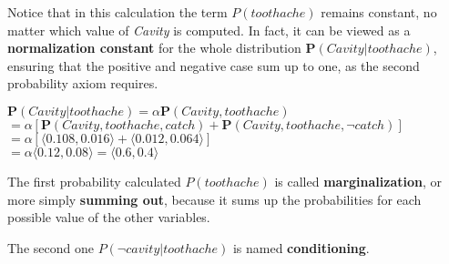 \begin{example}
    Notice that in this calculation the term $P(toothache)$ remains constant, no matter which value of \textit{Cavity} is computed. In fact, it can be viewed as a \textbf{normalization constant} for the whole distribution $\mathbf{P}(Cavity|toothache)$, ensuring that the positive and negative case sum up to one, as the second probability axiom requires. \vspace*{7pt}

    $\mathbf{P}(Cavity|toothache) = \alpha\mathbf{P}(Cavity, toothache)$ \\
    $= \alpha[\mathbf{P}(Cavity, toothache, catch) + \mathbf{P}(Cavity, toothache, \neg catch)]$ \\
    $= \alpha[\langle0.108, 0.016\rangle + \langle0.012, 0.064\rangle]$ \\
    $= \alpha\langle0.12, 0.08\rangle = \langle0.6, 0.4\rangle$
\end{example}
\begin{definition}
    The first probability calculated $P(toothache)$ is called \textbf{marginalization}, or more simply \textbf{summing out}, because it sums up the probabilities for each possible value of the other variables.
\end{definition}
\begin{definition}
    The second one $P(\neg cavity|toothache)$ is named \textbf{conditioning}.
\end{definition}